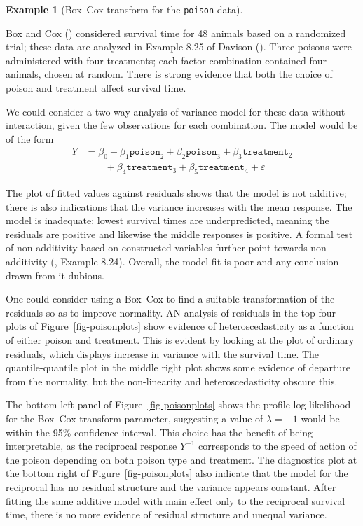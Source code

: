 \documentclass[
  11pt,
  letterpaper,
]{scrbook}
\theoremstyle{definition}
\theoremstyle{definition}
\newtheorem{example}{Example}[chapter]
\theoremstyle{plain}
\theoremstyle{plain}
\theoremstyle{remark}
\begin{document}
\begin{example}[Box--Cox transform for the \texttt{poison}
data]\protect\hypertarget{exm-poisonboxcox}{}\label{exm-poisonboxcox}

Box and Cox () considered survival time
for 48 animals based on a randomized trial; these data are analyzed in
Example 8.25 of Davison (). Three
poisons were administered with four treatments; each factor combination
contained four animals, chosen at random. There is strong evidence that
both the choice of poison and treatment affect survival time.

We could consider a two-way analysis of variance model for these data
without interaction, given the few observations for each combination.
The model would be of the form \begin{align*}
Y &= \beta_0 + \beta_1 \texttt{poison}_2 + \beta_2\texttt{poison}_3  +\beta_3\texttt{treatment}_2 \\ &\qquad+ \beta_4\texttt{treatment}_3
+\beta_5\texttt{treatment}_4 + \varepsilon
\end{align*}

The plot of fitted values against residuals shows that the model is not
additive; there is also indications that the variance increases with the
mean response. The model is inadequate: lowest survival times are
underpredicted, meaning the residuals are positive and likewise the
middle responses is positive. A formal test of non-additivity based on
constructed variables further point towards non-additivity
(, Example 8.24). Overall, the
model fit is poor and any conclusion drawn from it dubious.

One could consider using a Box--Cox to find a suitable transformation of
the residuals so as to improve normality. AN analysis of residuals in
the top four plots of Figure~\ref{fig-poisonplots} show evidence of
heteroscedasticity as a function of either poison and treatment. This is
evident by looking at the plot of ordinary residuals, which displays
increase in variance with the survival time. The quantile-quantile plot
in the middle right plot shows some evidence of departure from the
normality, but the non-linearity and heteroscedasticity obscure this.

The bottom left panel of Figure~\ref{fig-poisonplots} shows the profile
log likelihood for the Box--Cox transform parameter, suggesting a value
of \(\lambda=-1\) would be within the 95\% confidence interval. This
choice has the benefit of being interpretable, as the reciprocal
response \(Y^{-1}\) corresponds to the speed of action of the poison
depending on both poison type and treatment. The diagnostics plot at the
bottom right of Figure~\ref{fig-poisonplots} also indicate that the
model for the reciprocal has no residual structure and the variance
appears constant. After fitting the same additive model with main effect
only to the reciprocal survival time, there is no more evidence of
residual structure and unequal variance.


\end{example}
\end{document}
